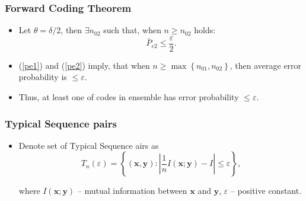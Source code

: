 \documentclass[14pt]{beamer}
\renewcommand{\vec}[1]{\ensuremath{\boldsymbol{#1}}}
\begin{document}
\begin{frame}
\frametitle{Forward Coding Theorem}
\begin{itemize}
    
    \item Let $\theta=\delta/2$, then $\exists n_{02}$ such that, when $n \ge n_{02}$ holds:
    \begin{equation} \label{pe2}
    \bar P_{e2} \le \frac {\varepsilon}{2}.
    \end{equation}
    
    
    \item (\ref{pe1}) and (\ref{pe2}) imply, that when $n \ge \max \left\{ {n_{01} ,n_{02}} \right\}$, then average error probability is $ \le \varepsilon $. 
    
    \item Thus, at least one of codes in ensemble has error probability $\le \varepsilon $.

\end{itemize}
\end{frame}



\begin{frame}
\frametitle{Typical Sequence pairs}
\begin{itemize}
    
    \item Denote set of Typical Sequence airs as
    \begin{equation}
        \label{def_typ_p}
        T_n(\varepsilon) = \left\{ ({\vec x},{\vec y}):\left|
        {\frac{1}{n}I({\vec x};{\vec y}) - I} \right| \le
        \varepsilon  \right\},
    \end{equation}
    
    where $I({\vec x};{\vec y})$ -- mutual information between ${\vec x}$ and ${\vec y}$, $\varepsilon$ -- positive constant.

\end{itemize}
\end{frame}
\end{document}
